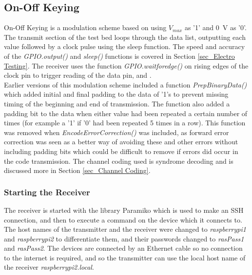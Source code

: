 \documentclass[../main.tex]{subfiles}
\begin{document}
\subsection{On-Off Keying} \label{sec_On-Off Keying}

On-Off Keying is a modulation scheme based on using $V_{max}$ as '1' and \SI{0}{\volt} as '0'.
The transmit section of the test bed loops through the data list, outputting each value followed by a clock pulse using the sleep function.
The speed and accuracy of the \textit{GPIO.output()} and \textit{sleep()} functions is covered in Section \ref{sec_Electro Testing}.
The receiver uses the function \textit{GPIO.wait\textunderscore for\textunderscore edge()} on rising edges of the clock pin to trigger reading of the data pin, and .\\

Earlier versions of this modulation scheme included a function \textit{Prep\textunderscore Binary\textunderscore Data()} which added initial and final padding to the data of '1's to prevent missing timing of the beginning and end of transmission.
The function also added a padding bit to the data when either value had been repeated a certain number of times (for example a '1' if '0' had been repeated 5 times in a row).
This function was removed when \textit{Encode\textunderscore Error\textunderscore Correction()} was included, as forward error correction was seen as a better way of avoiding these and other errors without including padding bits which could be difficult to remove if errors did occur in the code transmission.
The channel coding used is syndrome decoding and is discussed more in Section \ref{sec_Channel Coding}.\\


\subsubsection{Starting the Receiver}

The receiver is started with the library Paramiko \cite{lib_Paramiko} which is used to make an SSH connection, and then to execute a command on the device which it connects to.
The host names of the transmitter and the receiver were changed to \textit{raspberrypi1} and \textit{raspberrypi2} to differentiate them, and their passwords changed to \textit{rasPass1} and \textit{rasPass2}.
The devices are connected by an Ethernet cable so no connection to the internet is required, and so the transmitter can use the local host name of the receiver \textit{raspberrypi2.local}.\\
\end{document}

